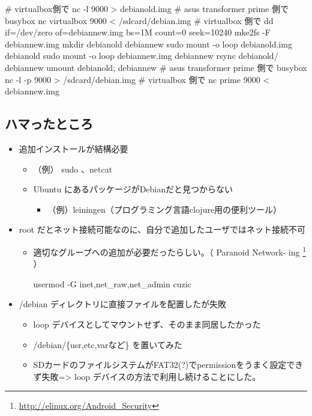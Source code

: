 \documentclass[mingoth,a4paper]{jsarticle}
\begin{document}
\begin{commandline}
# virtualbox側で
nc -l 9000 > debianold.img
# asus transformer prime 側で
busybox nc virtualbox 9000 < /sdcard/debian.img
# virtualbox 側で
dd if=/dev/zero of=debiannew.img bs=1M count=0 seek=10240
mke2fs -F debiannew.img
mkdir debianold debiannew
sudo mount -o loop debianold.img debianold
sudo mount -o loop debiannew.img debiannew
rsync debianold/ debiannew
umount debianold; debiannew
# asus transformer prime 側で
busybox nc -l -p 9000 > /sdcard/debian.img
# virtualbox 側で
nc prime 9000 < debiannew.img
\end{commandline}

\subsection{ハマったところ}
\begin{itemize}
 \item 追加インストールが結構必要
       \begin{itemize}
        \item （例） sudo 、netcat
        \item Ubuntu にあるパッケージがDebianだと見つからない
              \begin{itemize}
               \item （例）leiningen（プログラミング言語clojure用の便利ツール）
              \end{itemize}
       \end{itemize}
 \item root だとネット接続可能なのに、自分で追加したユーザではネット接続不可
       \begin{itemize}
        \item 適切なグループへの追加が必要だったらしい。（ Paranoid
              Network- ing
              \footnote{\url{http://elinux.org/Android_Security}} ）
        \begin{commandline}
usermod -G inet,net\_raw,net\_admin cuzic
        \end{commandline}
       \end{itemize}
 \item /debian ディレクトリに直接ファイルを配置したが失敗
       \begin{itemize}
        \item loop デバイスとしてマウントせず、そのまま同居したかった
        \item /debian/\{usr,etc,varなど\} を置いてみた
        \item SDカードのファイルシステムがFAT32(?)でpermissionをうまく設定できず失敗=> loop デバイスの方法で利用し続けることにした。

\end{itemize}
\end{itemize}
\end{document}
